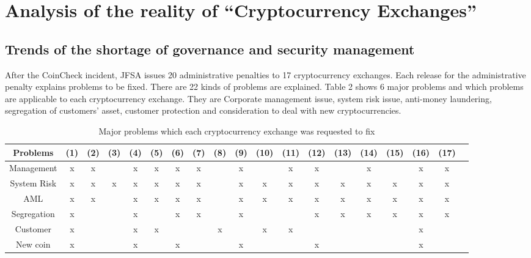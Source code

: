 \section{Analysis of the reality of ``Cryptocurrency Exchanges''}

\subsection{Trends of the shortage of governance and security management}
After the CoinCheck incident, JFSA issues 20 administrative penalties to 17 cryptocurrency exchanges.
Each release for the administrative penalty explains problems to be fixed. There are 22 kinds of problems are explained. Table 2 shows 6 major problems and which problems are applicable to each cryptocurrency exchange.
They are Corporate management issue, system risk issue, anti-money laundering, segregation of customers' asset, customer protection and
consideration to deal with new cryptocurrencies.

\begin{table}
\begin{center}
\caption{Major problems which each cryptocurrency exchange was requested to fix}
\begin{tabular}{|c|c|c|c|c|c|c|c|c|c|c|c|c|c|c|c|c|c|c|}\hline
Problems & (1) & (2) & (3)& (4) & (5) & (6)& (7) & (8) & (9)& (10) & (11) & (12)& (13) & (14) & (15)& (16) & (17)  \\ \hline
Management & x & x &  & x & x & x & x &  & x &  & x & x &  & x &  & x &  x \\ \hline
System Risk & x & x & x & x & x & x & x &  & x & x & x & x & x & x & x & x & x   \\ \hline
AML & x & x & & x & x & x & x &  & x & x & x & x & x & x & x & x & x  \\ \hline
Segregation & x &  & & x &  & x & x &  & x &  &  & x & x & x & x & x & x   \\ \hline
Customer  & x &  & & x & x &  &  & x & & x & x & &  &  & & x &    \\ \hline
New coin & x &  & & x &  & x &  &  & x &  &  & x &  &  & & x &    \\ \hline
\end{tabular}
\label{incidents}
\end{center}
\end{table}

